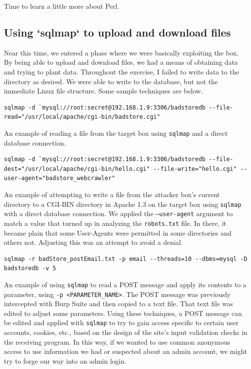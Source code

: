 Time to learn a little more about Perl.

\subsection{Using `sqlmap` to upload and download files}
Near this time, we entered a phase where we were basically exploiting the box.  By being able to upload and download files, we had a means of obtaining data and trying to plant data.  Throughout the exercise, I failed to write data to the directory as desired.  We were able to write to the database, but not the immediate Linux file structure.  Some sample techniques are below.

\begin{lstlisting}
sqlmap -d `mysql://root:secret@192.168.1.9:3306/badstoredb --file-read="/usr/local/apache/cgi-bin/badstore.cgi"
\end{lstlisting}
An example of reading a file from the target box using \texttt{sqlmap} and a direct database connection.

\begin{lstlisting}
sqlmap -d `mysql://root:secret@192.168.1.9:3306/badstoredb --file-dest="/usr/local/apache/cgi-bin/hello.cgi" --file-write="hello.cgi" --user-agent="badstore_webcrawler"
\end{lstlisting}
An example of attempting to write a file from the attacker box's current directory to a CGI-BIN directory in Apache 1.3 on the target box using \texttt{sqlmap} with a direct database connection.  We applied the \texttt{--user-agent} argument to match a value that turned up in analyzing the \texttt{robots.txt} file.  In there, it became plain that some User-Agents were permitted in some directories and others not.  Adjusting this was an attempt to avoid a denial.

\begin{lstlisting}
sqlmap -r badStore_postEmail.txt -p email --threads=10 --dbms=mysql -D badstoredb -v 5
\end{lstlisting}
An example of using \texttt{sqlmap} to read a POST message and apply its contents to a parameter, using \texttt{-p <PARAMETER\_NAME>}.  The POST message was previously intercepted with Burp Suite and then copied to a text file.  That text file was edited to adjust some parameters.  Using these techniques, a POST message can be edited and applied with \texttt{sqlmap} to try to gain access specific to certain user accounts, cookies, etc., based on the design of the site's input validation checks in the receiving program.  In this way, if we wanted to use common anonymous access to use information we had or suspected about an admin account, we might try to forge our way into an admin login.  

